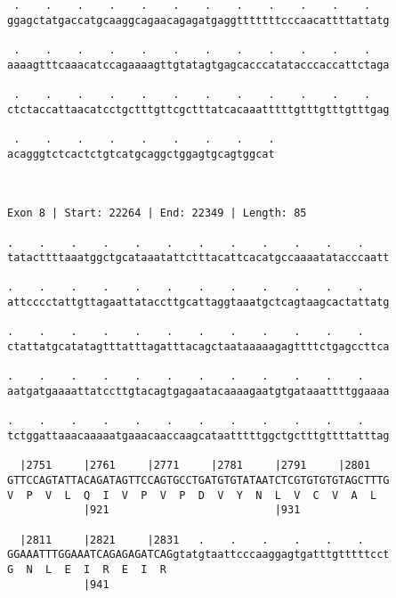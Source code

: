 \documentclass{article}
\begin{document}
\begin{Verbatim}
 .    .    .    .    .    .    .    .    .    .    .    .   
ggagctatgaccatgcaaggcagaacagagatgaggtttttttcccaacattttattatg
                                                            
 .    .    .    .    .    .    .    .    .    .    .    .   
aaaagtttcaaacatccagaaaagttgtatagtgagcacccatatacccaccattctaga
                                                            
 .    .    .    .    .    .    .    .    .    .    .    .   
ctctaccattaacatcctgctttgttcgctttatcacaaatttttgtttgtttgtttgag
                                                            
 .    .    .    .    .    .    .    .    .
acagggtctcactctgtcatgcaggctggagtgcagtggcat
                                          
                                          
 
Exon 8 | Start: 22264 | End: 22349 | Length: 85
 
.    .    .    .    .    .    .    .    .    .    .    .    
tatacttttaaatggctgcataaatattctttacattcacatgccaaaatatacccaatt
                                                            
.    .    .    .    .    .    .    .    .    .    .    .    
attcccctattgttagaattataccttgcattaggtaaatgctcagtaagcactattatg
                                                            
.    .    .    .    .    .    .    .    .    .    .    .    
ctattatgcatatagtttatttagatttacagctaataaaaagagttttctgagccttca
                                                            
.    .    .    .    .    .    .    .    .    .    .    .    
aatgatgaaaattatccttgtacagtgagaatacaaaagaatgtgataaattttggaaaa
                                                            
.    .    .    .    .    .    .    .    .    .    .    .    
tctggattaaacaaaaatgaaacaaccaagcataatttttggctgctttgttttatttag
                                                            
  |2751     |2761     |2771     |2781     |2791     |2801   
GTTCCAGTATTACAGATAGTTCCAGTGCCTGATGTGTATAATCTCGTGTGTGTAGCTTTG
V  P  V  L  Q  I  V  P  V  P  D  V  Y  N  L  V  C  V  A  L  
            |921                          |931              
  
  |2811     |2821     |2831   .    .    .    .    .    .    
GGAAATTTGGAAATCAGAGAGATCAGgtatgtaattcccaaggagtgatttgtttttcct
G  N  L  E  I  R  E  I  R                                   
            |941                                            
  

\end{Verbatim}
\end{document}
